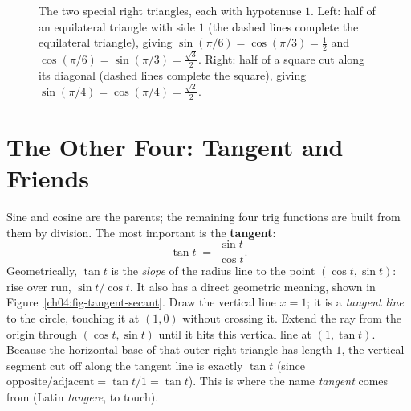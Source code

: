 \begin{figure}[htbp]
\centering
{}
\caption{The two special right triangles, each with hypotenuse $1$. Left: half of an equilateral triangle with side $1$ (the dashed lines complete the equilateral triangle), giving $\sin(\pi/6) = \cos(\pi/3) = \tfrac12$ and $\cos(\pi/6) = \sin(\pi/3) = \tfrac{\sqrt3}{2}$. Right: half of a square cut along its diagonal (dashed lines complete the square), giving $\sin(\pi/4) = \cos(\pi/4) = \tfrac{\sqrt2}{2}$.}
\label{ch04:fig-special-triangles}
\end{figure}

\section{The Other Four: Tangent and Friends}
\label{ch04:tangent}

Sine and cosine are the parents; the remaining four trig functions are built from them by division. The most important is the \textbf{tangent}:
\[
  \tan t \;=\; \frac{\sin t}{\cos t}.
\]
Geometrically, $\tan t$ is the \emph{slope} of the radius line to the point $(\cos t,\sin t)$: rise over run, $\sin t / \cos t$. It also has a direct geometric meaning, shown in Figure~\ref{ch04:fig-tangent-secant}. Draw the vertical line $x = 1$; it is a \emph{tangent line} to the circle, touching it at $(1,0)$ without crossing it. Extend the ray from the origin through $(\cos t,\sin t)$ until it hits this vertical line at $(1,\tan t)$. Because the horizontal base of that outer right triangle has length $1$, the vertical segment cut off along the tangent line is exactly $\tan t$ (since $\text{opposite}/\text{adjacent} = \tan t/1 = \tan t$). This is where the name \emph{tangent} comes from (Latin \emph{tangere}, to touch).

